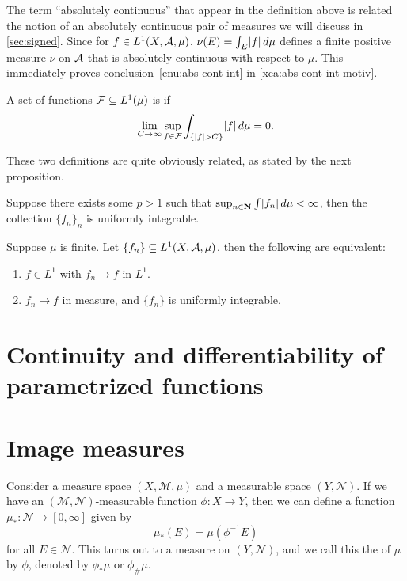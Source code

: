 The term ``absolutely continuous'' that appear in the definition above is related the notion of an absolutely continuous pair of measures we will discuss in \cref{sec:signed}. Since for $f \in L^1(X,\mathcal{A},\mu)$, $\nu(E) = \int_E \lvert f \rvert \,d\mu$ defines a finite positive measure $\nu$ on $\mathcal{A}$ that is absolutely continuous with respect to $\mu$. This immediately proves conclusion~\ref{enu:abs-cont-int} in \cref{xca:abs-cont-int-motiv}.

\begin{defn}
    A set of functions $\mathcal{F}\subseteq L^1(\mu)$ is  if \[
        \lim_{C \to \infty} \sup_{f\in \mathcal{F}} \int_{\{\lvert f \rvert > C\}} \lvert f \rvert\,d\mu = 0.
    \]
\end{defn}

These two definitions are quite obviously related, as stated by the next proposition.

\begin{prop}
    
\end{prop}

\begin{xca}
    Suppose there exists some $p > 1$ such that $\sup_{n\in \mathbf{N}} \int \lvert f_n \rvert\,d\mu <\infty$, then the collection $\{f_n\}_n$ is uniformly integrable.
\end{xca}

\begin{namedthm}
    Suppose $\mu$ is finite. Let $\{f_n\} \subseteq L^1(X,\mathcal{A},\mu)$, then the following are equivalent: 
    \begin{enumerate}
        \item $f \in L^1$ with $f_n \to f$ in $L^1$.
        \item $f_n \to f$ in measure, and $\{f_n\}$ is uniformly integrable.
    \end{enumerate}
\end{namedthm}
\section{Continuity and differentiability of parametrized functions}

\section{Image measures} \label{sec:image-measure}
Consider a measure space $(X,\mathcal{M},\mu)$ and a measurable space $(Y,\mathcal{N})$. If we have an $(\mathcal{M},\mathcal{N})$-measurable function $\phi\colon X \to Y$, then we can define a function $\mu_{*}\colon \mathcal{N} \to [0,\infty]$ given by \[
    \mu_{*}(E) =  \mu(\phi^{-1}E)
\] for all $E\in \mathcal{N}$. This turns out to a measure on $(Y,\mathcal N)$, and we call this the  of $\mu$ by $\phi$, denoted by $\phi_*\mu$ or $\phi_{\#}\mu$.

